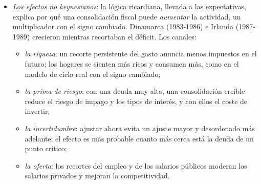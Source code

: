 \documentclass[11pt]{article}
\begin{document}
\begin{itemize}
\begin{itemize}
  \item \emph{Mercados de capitales perfectos}: si un hogar no puede endeudarse, o lo hace a un tipo mayor que el Estado, una rebaja de impuestos financiada con deuda es un préstamo que no conseguiría en el mercado, y la consume. Son los hogares que viven al día (\ref{sec:nek-fiscal}).
  \item \emph{Certidumbre sobre quién pagará}: si los impuestos futuros dependen de una renta incierta, la rebaja de hoy reduce el riesgo de la renta disponible de mañana y el hogar ahorra menos de lo que le rebajan.
  \item \emph{Racionalidad y previsión}: con miopía o racionalidad limitada, los hogares no anticipan los impuestos de mañana  .
  \item \emph{Senda del gasto dada}: si la deuda de hoy cambia lo que se espera que gaste el Estado mañana, cambia la riqueza de los hogares aunque el resto se cumpla.
  \item \emph{Economía cerrada}: en una economía abierta con expectativas racionales e impuestos de suma fija, la equivalencia se mantiene, pero el gasto se transmite al otro país: a corto plazo el multiplicador es 1~sin apreciar la moneda y, a largo plazo, la expansión mejora la relación real de intercambio del país y empobrece al vecino (anexo~\ref{anexo:corsetti-pesenti}).
  \end{itemize}
\item \emph{Los efectos no keynesianos}: la lógica ricardiana, llevada a las expectativas, explica por qué una consolidación fiscal puede \emph{aumentar} la actividad, un multiplicador con el signo cambiado\nocite{GiavazziPagano1990}. Dinamarca (1983-1986) e Irlanda (1987-1989) crecieron mientras recortaban el déficit. Los canales:
  \begin{itemize}
  \item \emph{la riqueza}: un recorte persistente del gasto anuncia menos impuestos en el futuro; los hogares se sienten más ricos y consumen más, como en el modelo de ciclo real con el signo cambiado;
  \item \emph{la prima de riesgo}: con una deuda muy alta, una consolidación creíble reduce el riesgo de impago y los tipos de interés, y con ellos el coste de invertir;
  \item \emph{la incertidumbre}: ajustar ahora evita un ajuste mayor y desordenado más adelante; el efecto es más probable cuanto más cerca está la deuda de un punto crítico\nocite{BertolaDrazen1993Trigger};
  \item \emph{la oferta}: los recortes del empleo y de los salarios públicos moderan los salarios privados y mejoran la competitividad\nocite{AlesinaPerotti1995Fiscal}.

\end{itemize}
\end{itemize}
\end{document}
